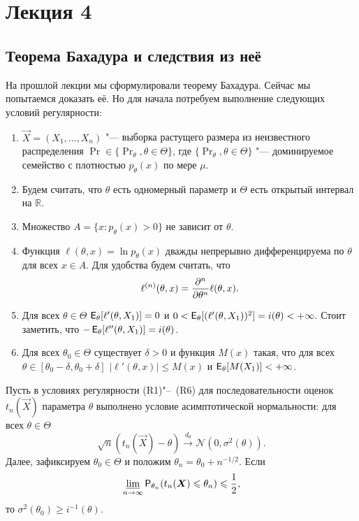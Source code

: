 
\section{Лекция 4}
\subsection{Теорема Бахадура и следствия из неё}
На прошлой лекции мы сформулировали теорему Бахадура. Сейчас мы попытаемся доказать её. Но для начала потребуем выполнение следующих условий регулярности:
\begin{enumerate}[label=(R\arabic*)]
    \item $\vec{X} = (X_{1}, \ldots, X_{n})$ "--- выборка растущего размера из неизвестного распределения $\Pr \in \{\Pr_{\theta}, \theta \in \Theta\}$, где $\{\Pr_{\theta}, \theta \in \Theta\}$ "--- доминируемое семейство с плотностью $p_{\theta}(x)$ по мере $\mu$.
    \item Будем считать, что $\theta$ есть одномерный параметр и $\Theta$ есть открытый интервал на $\mathbb{R}$.
    \item Множество $A = \{x \colon p_{\theta}(x) > 0\}$ не зависит от $\theta$.
    \item Функция $\ell(\theta, x) = \ln p_{\theta}(x)$ дважды непрерывно дифференцируема по $\theta$ для всех $x \in A$. Для удобства будем считать, что
    \[
        \ell^{(n)}(\theta, x) = \pdv[n]{\theta} \ell(\theta, x).
    \]
    \item Для всех $\theta \in \Theta$ $\EE_{\theta}[\ell'(\theta, X_{1})] = 0$ и $0 < \EE_{\theta}[(\ell'(\theta, X_{1}))^{2}] = i(\theta) < +\infty$. Стоит заметить, что $-\EE_{\theta}[\ell''(\theta, X_{1})] = i(\theta)$.
    \item Для всех $\theta_{0} \in \Theta$ существует $\delta > 0$ и функция $M(x)$ такая, что для всех $\theta \in [\theta_{0} - \delta, \theta_{0} + \delta]$ $|\ell'(\theta, x)| \leq M(x)$ и $\EE_{\theta}[M(X_{1})] < +\infty$.
\end{enumerate}
\begin{theorem}
    Пусть в условиях регулярности (R1)"--~(R6) для последовательности оценок $t_{n}(\vec{X})$ параметра $\theta$ выполнено условие асимптотической нормальности: для всех $\theta \in \Theta$
    \[
        \sqrt{n}(t_{n}(\vec{X}) - \theta) \xrightarrow{d_{\theta}} \mathcal{N}(0, \sigma^{2}(\theta)).
    \]
    Далее, зафиксируем $\theta_{0} \in \Theta$ и положим $\theta_{n} = \theta_{0} + n^{-1/2}$. Если
    \[
        \varliminf_{n \to \infty} \Pr_{\theta_{n}}(t_{n}(\vec{X}) \leq \theta_{n}) \leq \frac{1}{2},
    \]
    то $\sigma^{2}(\theta_{0}) \geq i^{-1}(\theta)$.
\end{theorem}
